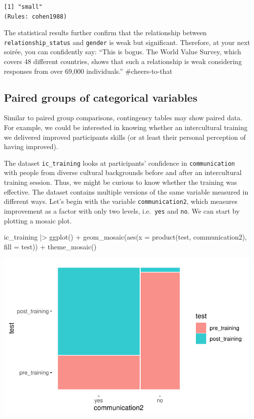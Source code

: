 \documentclass[
  letterpaper,
]{krantz}
\makeatletter
\newenvironment{Shaded}{\begin{snugshade}}{\end{snugshade}}
\newcommand{\AttributeTok}[1]{\textcolor[rgb]{0.40,0.45,0.13}{#1}}
\newcommand{\FunctionTok}[1]{\textcolor[rgb]{0.28,0.35,0.67}{#1}}
\newcommand{\NormalTok}[1]{\textcolor[rgb]{0.00,0.23,0.31}{#1}}
\newcommand{\SpecialCharTok}[1]{\textcolor[rgb]{0.37,0.37,0.37}{#1}}
\newenvironment{kframe}{%
\medskip{}
\setlength{\fboxsep}{.8em}
 \def\at@end@of@kframe{}%
 \ifinner\ifhmode%
  \def\at@end@of@kframe{\end{minipage}}%
  \begin{minipage}{\columnwidth}%
 \fi\fi%
 \def\FrameCommand##1{\hskip\@totalleftmargin \hskip-\fboxsep
 \colorbox{shadecolor}{##1}\hskip-\fboxsep
     \hskip-\linewidth \hskip-\@totalleftmargin \hskip\columnwidth}%
 \MakeFramed {\advance\hsize-\width
   \@totalleftmargin\z@ \linewidth\hsize
   \@setminipage}}%
 {\par\unskip\endMakeFramed%
 \at@end@of@kframe}
\renewenvironment{Shaded}{\begin{kframe}}{\end{kframe}}
\makeatother
\begin{document}
\begin{verbatim}
[1] "small"
(Rules: cohen1988)
\end{verbatim}

The statistical results further confirm that the relationship between
\texttt{relationship\_status} and \texttt{gender} is weak but
significant. Therefore, at your next soirée, you can confidently say:
``This is bogus. The World Value Survey, which covers 48 different
countries, shows that such a relationship is weak considering responses
from over 69,000 individuals.'' \#cheers-to-that

\subsection{Paired groups of categorical
variables}\label{sec-paired-groups-categorical-variables}

Similar to paired group comparisons, contingency tables may show paired
data. For example, we could be interested in knowing whether an
intercultural training we delivered improved participants skills (or at
least their personal perception of having improved).

The dataset \texttt{ic\_training} looks at participants' confidence in
\texttt{communication} with people from diverse cultural backgrounds
before and after an intercultural training session. Thus, we might be
curious to know whether the training was effective. The dataset contains
multiple versions of the same variable measured in different ways. Let's
begin with the variable \texttt{communication2}, which measures
improvement as a factor with only two levels, i.e.~\texttt{yes} and
\texttt{no}. We can start by plotting a mosaic plot.

\begin{Shaded}
\begin{Highlighting}[]
\NormalTok{ic\_training }\SpecialCharTok{|\textgreater{}}
  \FunctionTok{ggplot}\NormalTok{() }\SpecialCharTok{+}
  \FunctionTok{geom\_mosaic}\NormalTok{(}\FunctionTok{aes}\NormalTok{(}\AttributeTok{x =} \FunctionTok{product}\NormalTok{(test, communication2),}
                  \AttributeTok{fill =}\NormalTok{ test)) }\SpecialCharTok{+}
  \FunctionTok{theme\_mosaic}\NormalTok{()}
\end{Highlighting}
\end{Shaded}

\includegraphics{11_group_comparison_files/figure-pdf/mosaic-plot-test-communication-two-by-two-1.pdf}
\end{document}

